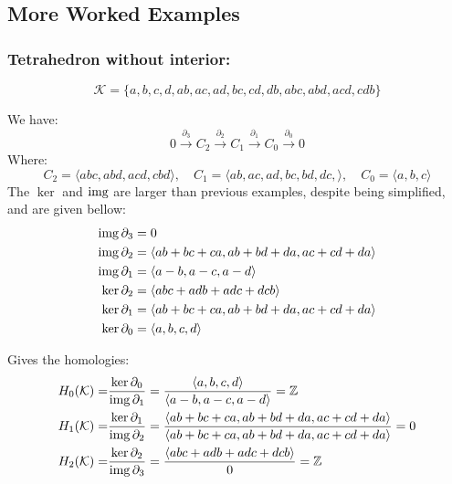 \subsection{More Worked Examples}
\subsubsection{Tetrahedron without interior:}
\begin{center}
\end{center}
\[\mathcal{K}=\{a,b,c,d,ab,ac,ad,bc,cd,db,abc,abd,acd,cdb\}\]

We have:
\[0 \stackrel{\partial_3}{\longrightarrow} C_2 \stackrel{\partial_2}{\longrightarrow} C_1 \stackrel{\partial_1}{\longrightarrow} C_0 \stackrel{\partial_0}{\longrightarrow} 0\]
Where:
\[C_2 = \langle abc,abd,acd,cbd \rangle,\quad C_1 = \langle ab,ac,ad,bc,bd,dc, \rangle,\quad C_0 = \langle a,b,c \rangle\]
The $\ker$ and $\operatorname{img}$ are larger than previous examples,
despite being simplified,
and are given bellow:
\begin{equation*}
\begin{aligned}
	\operatorname{img} \partial_3 &= 0 \\
	\operatorname{img} \partial_2 &= \langle ab+bc+ca,ab+bd+da,ac+cd+da\rangle\\ 
	\operatorname{img} \partial_1 &= \langle a-b,a-c,a-d\rangle\\
	\ker \partial_2 &= \langle abc+adb+adc+dcb\rangle\\
	\ker \partial_1 &= \langle ab+bc+ca,ab+bd+da,ac+cd+da\rangle\\
	\ker \partial_0 &= \langle a,b,c,d\rangle\\
\end{aligned}
\end{equation*}

Gives the homologies:
\begin{equation*}
\begin{aligned}
	H_0(\mathcal{K}) =& \frac{\ker\partial_0}{\operatorname{img}\partial_1} = \frac{\langle a,b,c,d\rangle}{\langle a-b,a-c,a-d\rangle} = \mathbb{Z}\\
	H_1(\mathcal{K}) =& \frac{\ker\partial_1}{\operatorname{img}\partial_2} = \frac{\langle ab+bc+ca,ab+bd+da,ac+cd+da\rangle}{\langle ab+bc+ca,ab+bd+da,ac+cd+da\rangle} = 0\\
	H_2(\mathcal{K}) =& \frac{\ker\partial_2}{\operatorname{img}\partial_3} = \frac{\langle abc+adb+adc+dcb\rangle}{0} = \mathbb{Z}\\
\end{aligned}
\end{equation*}

